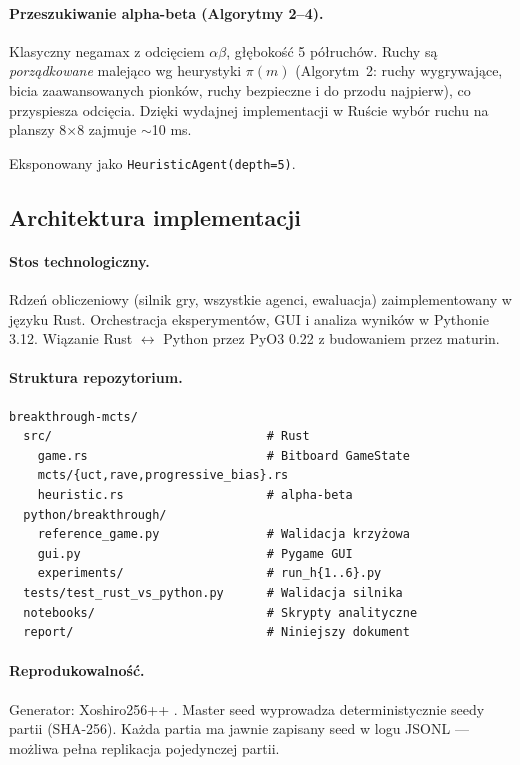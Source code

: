 \paragraph{Przeszukiwanie alpha-beta (Algorytmy 2--4).}
Klasyczny negamax z odcięciem $\alpha\beta$, głębokość 5 półruchów.
Ruchy są \emph{porządkowane} malejąco wg heurystyki $\pi(m)$ (Algorytm~2:
ruchy wygrywające, bicia zaawansowanych pionków, ruchy bezpieczne i do przodu
najpierw), co przyspiesza odcięcia. Dzięki wydajnej implementacji w Ruście
wybór ruchu na planszy 8$\times$8 zajmuje $\sim$10 ms.

Eksponowany jako \texttt{HeuristicAgent(depth=5)}.

\subsection{Architektura implementacji}

\paragraph{Stos technologiczny.}
Rdzeń obliczeniowy (silnik gry, wszystkie agenci, ewaluacja) zaimplementowany
w języku Rust. Orchestracja eksperymentów, GUI i analiza wyników w Pythonie 3.12.
Wiązanie Rust $\leftrightarrow$ Python przez PyO3 0.22 z budowaniem przez maturin.

\paragraph{Struktura repozytorium.}
\begin{verbatim}
breakthrough-mcts/
  src/                              # Rust
    game.rs                         # Bitboard GameState
    mcts/{uct,rave,progressive_bias}.rs
    heuristic.rs                    # alpha-beta
  python/breakthrough/
    reference_game.py               # Walidacja krzyżowa
    gui.py                          # Pygame GUI
    experiments/                    # run_h{1..6}.py
  tests/test_rust_vs_python.py      # Walidacja silnika
  notebooks/                        # Skrypty analityczne
  report/                           # Niniejszy dokument
\end{verbatim}

\paragraph{Reprodukowalność.}
Generator: Xoshiro256++ \cite{vigna2017}. Master seed wyprowadza
deterministycznie seedy partii (SHA-256). Każda partia ma jawnie zapisany seed
w logu JSONL --- możliwa pełna replikacja pojedynczej partii.

